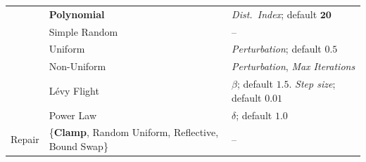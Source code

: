 \documentclass[journal]{IEEEtran}
\begin{document}
\begin{table}[htbp]
\begin{tabular}{lll}
 & \textbf{Polynomial} & \textit{Dist.\ Index}; default $\mathbf{20}$ \\
 & Simple Random & -- \\
 & Uniform & \textit{Perturbation}; default $0.5$ \\
 & Non-Uniform & \textit{Perturbation}, \textit{Max Iterations} \\
 & L\'evy Flight & $\beta$; default $1.5$. \textit{Step size}; default $0.01$ \\
 & Power Law & $\delta$; default $1.0$ \\ \midrule
\multirow{1}{*}{Repair} & \{\textbf{Clamp}, Random Uniform, Reflective, Bound Swap\} & -- \\ \bottomrule
\end{tabular}%
\end{table}



\end{document}
